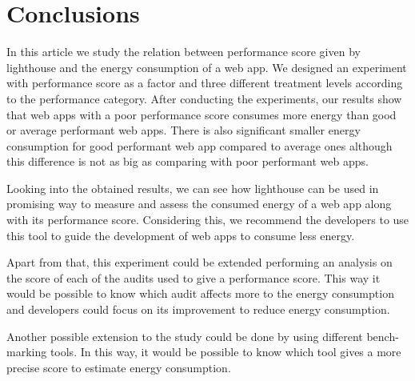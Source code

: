 \section{Conclusions}\label{sec:conclusions}

In this article we study the relation between performance score given by lighthouse and the energy consumption of a web app. We designed an experiment with performance score as a factor and three different treatment levels according to the performance category. After conducting the experiments, our results show that web apps with a poor performance score consumes more energy than good or average performant web apps. There is also significant smaller energy consumption for good performant web app compared to average ones although this difference is not as big as comparing with poor performant web apps. \newline 

Looking into the obtained results, we can see how lighthouse can be used in promising way to measure and assess the consumed energy of a web app along with its performance score. Considering this, we recommend the developers to use this tool to guide the development of web apps to consume less energy.\newline

Apart from that, this experiment could be extended performing an analysis on the score of each of the audits used to give a performance score. This way it would be possible to know which audit affects more to the energy consumption and developers could focus on its improvement to reduce energy consumption. \newline

Another possible extension to the study could be done by using different bench-marking tools. In this way, it would be possible to know which tool gives a more precise score to estimate energy consumption.
